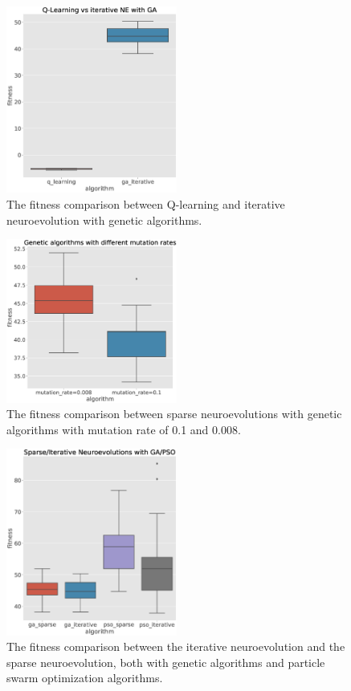 \documentclass[conference]{IEEEtran}
\begin{document}
\begin{figure}[!h]
    \centering
    \includegraphics[width=0.5\textwidth]{images/q_vs_ga_iterative.eps}
    \caption{The fitness comparison between Q-learning and iterative neuroevolution with genetic algorithms.}
    \label{fig:q_vs_ga_iterative}
\end{figure}

\begin{figure}[!h]
    \centering
    \includegraphics[width=0.5\textwidth]{images/ga_mutation_rates.eps}
    \caption{The fitness comparison between sparse neuroevolutions with genetic algorithms with mutation rate of 0.1 and 0.008.}
    \label{fig:ga_mutation_rates}
\end{figure}

\begin{figure}[!h]
    \centering
    \includegraphics[width=0.5\textwidth]{images/overview.eps}
    \caption{The fitness comparison between the iterative neuroevolution and the sparse neuroevolution,
    both with genetic algorithms and particle swarm optimization algorithms. }
    \label{fig:overview}
\end{figure}
\end{document}
